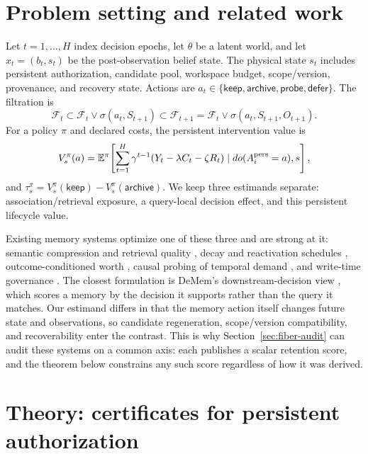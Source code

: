 \documentclass{article}
\newcommand{\keep}{\mathsf{keep}}
\newcommand{\archive}{\mathsf{archive}}
\newcommand{\probe}{\mathsf{probe}}
\newcommand{\defer}{\mathsf{defer}}
\newcommand{\E}{\mathbb{E}}
\begin{document}
\section{Problem setting and related work}
Let $t=1,\ldots,H$ index decision epochs, let $\theta$ be a latent world, and let $x_t=(b_t,s_t)$ be the post-observation belief state. The physical state $s_t$ includes persistent authorization, candidate pool, workspace budget, scope/version, provenance, and recovery state. Actions are $a_t\in\{\keep,\archive,\probe,\defer\}$. The filtration is
\begin{equation}
\mathcal F_t\subset\mathcal F_t\vee\sigma(a_t,S_{t+1})\subset\mathcal F_{t+1}=\mathcal F_t\vee\sigma(a_t,S_{t+1},O_{t+1}).
\end{equation}
For a policy $\pi$ and declared costs, the persistent intervention value is
\begin{equation}
V_s^\pi(a)=\E^\pi\!\left[\sum_{t=1}^H\gamma^{t-1}(Y_t-\lambda C_t-\zeta R_t)\mid do(A_i^{\rm pers}=a),s\right],
\end{equation}
and $\tau_s^\pi=V_s^\pi(\keep)-V_s^\pi(\archive)$. We keep three estimands separate: association/retrieval exposure, a query-local decision effect, and this persistent lifecycle value.

Existing memory systems optimize one of these three and are strong at it: semantic
compression and retrieval quality \citep{simplemem}, decay and reactivation
schedules \citep{oblivion}, outcome-conditioned worth \citep{memoryworth}, causal
probing of temporal demand \citep{trivium}, and write-time governance
\citep{govmem}. The closest formulation is DeMem's downstream-decision view
\citep{zou2026demem}, which scores a memory by the decision it supports rather than
the query it matches. Our estimand differs in that the memory action itself changes
future state and observations, so candidate regeneration, scope/version
compatibility, and recoverability enter the contrast. This is why
Section~\ref{sec:fiber-audit} can audit these systems on a common axis: each
publishes a scalar retention score, and the theorem below constrains any such
score regardless of how it was derived.

\section{Theory: certificates for persistent authorization}
\end{document}
